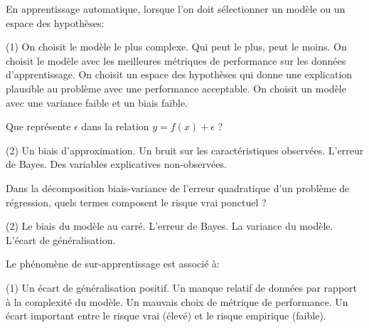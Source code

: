 \documentclass[solutions]{../cc}
\begin{document}
	\begin{question}
		En apprentissage automatique, lorsque l'on doit sélectionner un modèle ou un espace des hypothèses:
		\begin{tasks}(1)
			\task On choisit le modèle le plus complexe. Qui peut le plus, peut le moins.
			\task On choisit le modèle avec les meilleures métriques de performance sur les données d'apprentissage.
			\task On choisit un espace des hypothèses qui donne une explication plausible au problème avec une performance acceptable.
			\task On choisit un modèle avec une variance faible et un biais faible.
		\end{tasks}
	\end{question}

	\begin{question}
		Que représente $\epsilon$ dans la relation $y = f(x) + \epsilon$ ?
		\begin{tasks}(2)
			\task Un biais d'approximation.
			\task Un bruit sur les caractéristiques observées.
			\task L'erreur de Bayes.
			\task Des variables explicatives non-observées.
		\end{tasks}
	\end{question}

		\begin{question}
			Dans la décomposition biais-variance de l'erreur quadratique d'un problème de régression, quels termes composent le risque vrai ponctuel ?
			\begin{tasks}(2)
				\task Le biais du modèle au carré.
				\task L'erreur de Bayes.
				\task La variance du modèle.
				\task L'écart de généralisation.
			\end{tasks}
		\end{question}

	\begin{question}
		Le phénomène de sur-apprentissage est associé à:
		\begin{tasks}(1)
			\task Un écart de généralisation positif.
			\task Un manque relatif de données par rapport à la complexité du modèle.
			\task Un mauvais choix de métrique de performance.
			\task Un écart important entre le risque vrai (élevé) et le risque empirique (faible).
		\end{tasks}
	\end{question}
\end{document}

